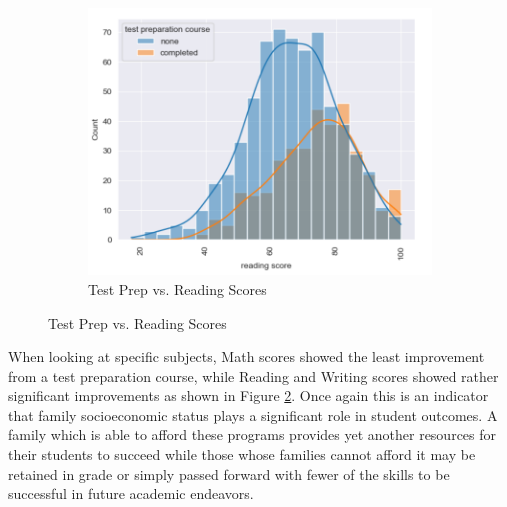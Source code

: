 \documentclass[doc]{apa6} %
\begin{document}
\begin{figure}[H]
    \begin{subfigure}[b]{0.25\textwidth}
        \includegraphics[width=\linewidth]{TestPrepReading.png}
        \caption{Test Prep vs. Reading Scores}
        \label{fig:TestPrepRead}
    \end{subfigure}
    \label{fig:TestPrepGraphs}
\end{figure}
When looking at specific subjects, Math scores showed the least improvement from a test preparation course, while Reading and Writing scores showed rather significant improvements as shown in Figure \ref{fig:TestPrepGraphs}.  Once again this is an indicator that family socioeconomic status plays a significant role in student outcomes. A family which is able to afford these programs provides yet another resources for their students to succeed while those whose families cannot afford it may be retained in grade or simply passed forward with fewer of the skills to be successful in future academic endeavors.
\end{document}
